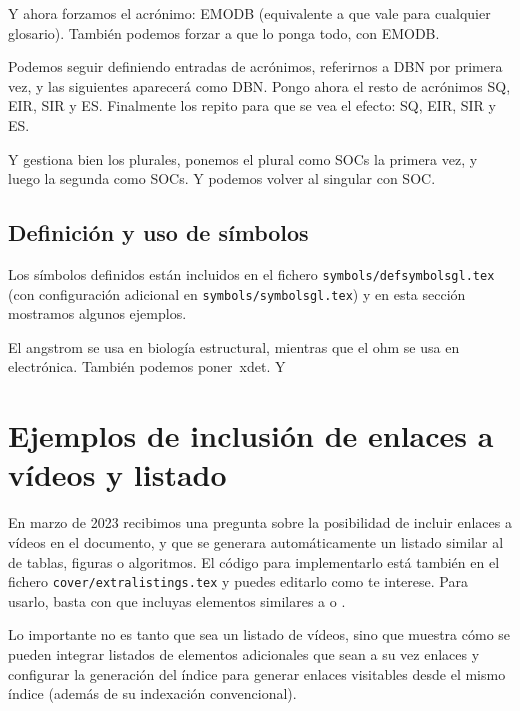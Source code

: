 \glsresetall[acronym]

Y ahora forzamos el acrónimo: \acs{EMODB} (equivalente a  que vale para cualquier glosario). También podemos forzar a que lo ponga todo, con \acf{EMODB}.


Podemos seguir definiendo entradas de acrónimos, referirnos a \ac{DBN} por primera vez, y las siguientes aparecerá como \ac{DBN}. Pongo ahora el resto de acrónimos \ac{SQ}, \ac{EIR}, \ac{SIR} y \ac{ES}. Finalmente los repito para que se vea el efecto: \ac{SQ}, \ac{EIR}, \ac{SIR} y \ac{ES}.

Y gestiona bien los plurales, ponemos el plural como \acp{SOC} la primera vez, y luego la segunda como \acp{SOC}. Y podemos volver al singular con \ac{SOC}.


\subsection{Definición y uso de símbolos}
\label{sec:simbolos}

Los símbolos definidos están incluidos en el fichero \texttt{symbols/defsymbolsgl.tex} (con configuración adicional en \texttt{symbols/symbolsgl.tex}) y en esta sección mostramos algunos ejemplos.

El \ac{angstrom} se usa en biología estructural, mientras que el \ac{ohm} se usa en electrónica. También podemos poner~\ac{xdet}. Y


\section{Ejemplos de inclusión de enlaces a vídeos y listado}
\label{sec:videolink}

En marzo de 2023 recibimos una pregunta sobre la posibilidad de incluir enlaces a vídeos en el documento, y que se generara automáticamente un listado similar al de tablas, figuras o algoritmos. El código para implementarlo está también en el fichero \texttt{cover/extralistings.tex} y puedes editarlo como te interese. Para usarlo, basta con que incluyas elementos similares a  o .

Lo importante no es tanto que sea un listado de vídeos, sino que muestra cómo se pueden integrar listados de elementos adicionales que sean a su vez enlaces y configurar la generación del índice para generar enlaces visitables desde el mismo índice (además de su indexación convencional).



